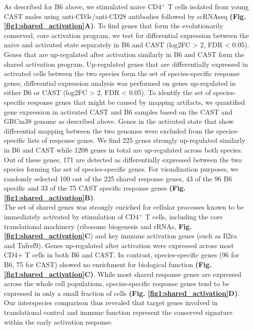 As described for B6 above, we stimulated naive CD4$^+$ T cells isolated from young CAST males using anti-CD3$\epsilon$/anti-CD28 antibodies followed by scRNAseq \textbf{(Fig. \ref{fig1:shared_activation}A)}. To find genes that form the evolutionarily conserved, core activation program, we test for differential expression between the naive and activated state separately in B6 and CAST (log2FC > 2, FDR < 0.05). Genes that are up-regulated after activation similarly in B6 and CAST form the shared activation program. Up-regulated genes that are differentially expressed in activated cells between the two species form the set of species-specific response genes; differential expression analysis was performed on genes up-regulated in either B6 or CAST (log2FC > 2, FDR < 0.05). To identify the set of species-specific response genes that might be caused by mapping artifacts, we quantified gene expression in activated CAST and B6 samples based on the CAST and GRCm38 genome as described above. Genes in the activated state that show differential mapping between the two genomes were excluded from the species-specific lists of response genes. We find 225 genes strongly up-regulated similarly in B6 and CAST while 1208 genes in total are up-regulated across both species. Out of these genes, 171 are detected as differentially expressed between the two species forming the set of species-specific genes. For visualization purposes, we randomly selected 100 out of the 225 shared response genes, 43 of the 96 B6 specific and 33 of the 75 CAST specific response genes \textbf{(Fig. \ref{fig1:shared_activation}B)}.\\

The set of shared genes was strongly enriched for cellular processes known to be immediately activated by stimulation of CD4$^+$ T cells, including the core translational machinery (ribosome biogenesis and rRNAs, \textbf{Fig. \ref{fig1:shared_activation}C}) and key immune activation genes (such as Il2ra and Tnfrsf9)\citep{Asmal2003}. Genes up-regulated after activation were expressed across most CD4+ T cells in both B6 and CAST. In contrast, species-specific genes (96 for B6, 75 for CAST) showed no enrichment for biological function \textbf{(Fig. \ref{fig1:shared_activation}C)}. While most shared response genes are expressed across the whole cell populations, species-specific response genes tend to be expressed in only a small fraction of cells \textbf{(Fig. \ref{fig1:shared_activation}D)}. \\

Our interspecies comparison thus revealed that target genes involved in translational control and immune function represent the conserved signature within the early activation response.

